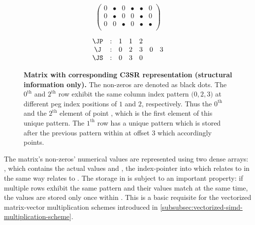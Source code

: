     \begin{figure}[ht]
      \centering
      \begin{minipage}{0.4\textwidth}
        \centering
        $$
        \begin{pmatrix}
          0 & \bullet & 0 & \bullet & \bullet & 0 \\
          0 & \bullet & 0 & 0 & \bullet & 0 \\
          0 & 0 & \bullet & 0 & \bullet & \bullet \\
        \end{pmatrix}
        $$
      \end{minipage}
      \begin{minipage}{0.4\textwidth}
        \centering
        $$
        \begin{matrix}
          \JP & : & 1 & 1 & 2 &   &   \\
           \J & : & 0 & 2 & 3 & 0 & 3 \\
          \JS & : & 0 & 3 & 0 &   &   \\
        \end{matrix}
        $$
      \end{minipage}
      \caption[Matrix with corresponding C3SR representation (structural information only).]{\textbf{Matrix with corresponding C3SR representation (structural information only).} The non-zeros are denoted as black dots. The $0^{\text{th}}$ and $2^{\text{th}}$ row exhibit the same column index pattern $\big(0,2,3\big)$ at different peg index positions of $1$ and $2$, respectively. Thus the $0^{\text{th}}$ and the $2^{\text{th}}$ element of \JS point \J[0], which is the first element of this unique pattern. The $1^{\text{th}}$ row has a unique pattern which is stored after the previous pattern within \J at offset $3$ which \JS[1] accordingly points.}
      \label{fig:c3sr_example_structure}
    \end{figure}

    The matrix's non-zeros' numerical values are represented using two dense arrays: \V, which contains the actual
    values and \VS, the index-pointer into \V which relates to \V in the same way \JS relates to \J. The storage in \V
    is subject to an important property: if multiple rows exhibit the same pattern and their values match at the same
    time, the values are stored only once within \V. This is a basic requisite for the vectorized matrix-vector
    multiplication schemes introduced in \ref{subsubsec:vectorized-simd-multiplication-scheme}.

